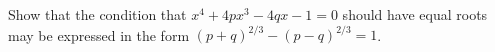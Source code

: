 Show that the condition that $x^{4} + 4px^{3} - 4qx - 1 = 0$ should have
equal roots may be expressed in the form $(p + q)^{2/3} - (p - q)^{2/3} = 1$.

